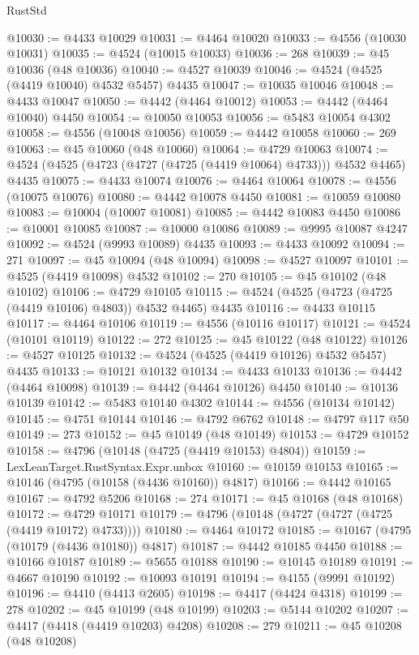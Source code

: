 \begin{lexlean}{RustStd}
\begin{coremodule}
@10030 := @4433 @10029
@10031 := @4464 @10020
@10033 := @4556 (@10030 @10031)
@10035 := @4524 (@10015 @10033)
@10036 := 268
@10039 := @45 @10036 (@48 @10036)
@10040 := @4527 @10039
@10046 := @4524 (@4525 (@4419 @10040) @4532 @5457) @4435
@10047 := @10035 @10046
@10048 := @4433 @10047
@10050 := @4442 (@4464 @10012)
@10053 := @4442 (@4464 @10040) @4450
@10054 := @10050 @10053
@10056 := @5483 @10054 @4302
@10058 := @4556 (@10048 @10056)
@10059 := @4442 @10058
@10060 := 269
@10063 := @45 @10060 (@48 @10060)
@10064 := @4729 @10063
@10074 := @4524 (@4525 (@4723 (@4727 (@4725 (@4419 @10064) @4733))) @4532 @4465) @4435
@10075 := @4433 @10074
@10076 := @4464 @10064
@10078 := @4556 (@10075 @10076)
@10080 := @4442 @10078 @4450
@10081 := @10059 @10080
@10083 := @10004 (@10007 @10081)
@10085 := @4442 @10083 @4450
@10086 := @10001 @10085
@10087 := @10000 @10086
@10089 := @9995 @10087 @4247
@10092 := @4524 (@9993 @10089) @4435
@10093 := @4433 @10092
@10094 := 271
@10097 := @45 @10094 (@48 @10094)
@10098 := @4527 @10097
@10101 := @4525 (@4419 @10098) @4532
@10102 := 270
@10105 := @45 @10102 (@48 @10102)
@10106 := @4729 @10105
@10115 := @4524 (@4525 (@4723 (@4725 (@4419 @10106) @4803)) @4532 @4465) @4435
@10116 := @4433 @10115
@10117 := @4464 @10106
@10119 := @4556 (@10116 @10117)
@10121 := @4524 (@10101 @10119)
@10122 := 272
@10125 := @45 @10122 (@48 @10122)
@10126 := @4527 @10125
@10132 := @4524 (@4525 (@4419 @10126) @4532 @5457) @4435
@10133 := @10121 @10132
@10134 := @4433 @10133
@10136 := @4442 (@4464 @10098)
@10139 := @4442 (@4464 @10126) @4450
@10140 := @10136 @10139
@10142 := @5483 @10140 @4302
@10144 := @4556 (@10134 @10142)
@10145 := @4751 @10144
@10146 := @4792 @6762
@10148 := @4797 @117 @50
@10149 := 273
@10152 := @45 @10149 (@48 @10149)
@10153 := @4729 @10152
@10158 := @4796 (@10148 (@4725 (@4419 @10153) @4804))
@10159 := LexLeanTarget.RustSyntax.Expr.unbox
@10160 := @10159 @10153
@10165 := @10146 (@4795 (@10158 (@4436 @10160)) @4817)
@10166 := @4442 @10165
@10167 := @4792 @5206
@10168 := 274
@10171 := @45 @10168 (@48 @10168)
@10172 := @4729 @10171
@10179 := @4796 (@10148 (@4727 (@4727 (@4725 (@4419 @10172) @4733))))
@10180 := @4464 @10172
@10185 := @10167 (@4795 (@10179 (@4436 @10180)) @4817)
@10187 := @4442 @10185 @4450
@10188 := @10166 @10187
@10189 := @5655 @10188
@10190 := @10145 @10189
@10191 := @4667 @10190
@10192 := @10093 @10191
@10194 := @4155 (@9991 @10192)
@10196 := @4410 (@4413 @2605)
@10198 := @4417 (@4424 @4318)
@10199 := 278
@10202 := @45 @10199 (@48 @10199)
@10203 := @5144 @10202
@10207 := @4417 (@4418 (@4419 @10203) @4208)
@10208 := 279
@10211 := @45 @10208 (@48 @10208)

\end{coremodule}
\end{lexlean}
